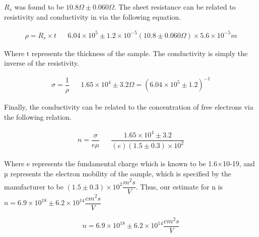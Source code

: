  $R_s$ was found to be $10.8\Omega \pm 0.060 \Omega$. The sheet resistance can be related to resistivity and conductivity in via the following equation.

\begin{align}
	\rho = R_s \times t && 6.04 \times 10^5\pm 1.2 \times10^{-5} (10.8\pm0.060\Omega) \times 5.6\times 10^{-5} m
\end{align}

Where t represents the thickness of the sample. The conductivity is simply the inverse of the resistivity.

\begin{align}
	\sigma = \dfrac{1}{\rho} && 1.65 \times 10^{4} \pm 3.2 \Omega = (6.04 \times 10^5\pm 1.2)^{-1}
\end{align}

Finally, the conductivity can be related to the concentration of free electrons via the following relation.

\begin{align}
	n = \dfrac{\sigma}{e \mu} && \dfrac{1.65 \times 10^{4} \pm 3.2}{(e)(1.5 \pm 0.3)\times 10^2}
\end{align}

Where e represents the fundamental charge which is known to be 1.6×10-19, and µ represents the electron mobility of the sample, which is specified by the manufacturer to be $(1.5 \pm 0.3)\times 10^2 \dfrac{m^2 s}{V}$. Thus, our estimate for n is $n=6.9\times10^{18}\pm 6.2 \times 10^{14} \dfrac{cm^2 s}{V}$

\begin{equation}
	n=6.9\times 10^{18} \pm 6.2 \times 10^{14} \dfrac{cm^2 s}{V}
\end{equation}